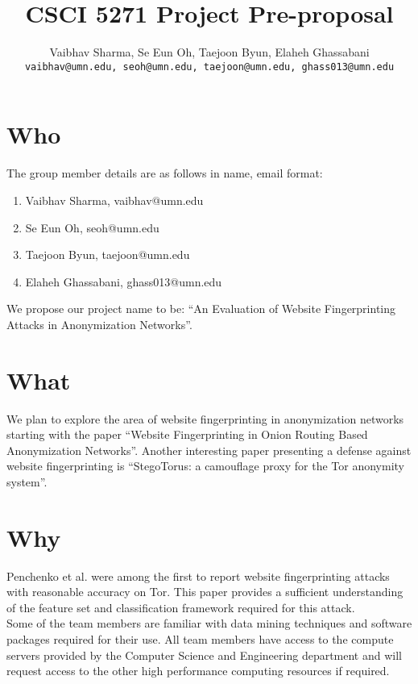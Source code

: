 \documentclass{article}
\title{CSCI 5271 Project Pre-proposal}
\author{Vaibhav Sharma, Se Eun Oh, Taejoon Byun, Elaheh Ghassabani\\
\texttt{vaibhav@umn.edu, seoh@umn.edu, taejoon@umn.edu, ghass013@umn.edu}\\
}
\begin{document}
\maketitle


\section{Who}
The group member details are as follows in name, email format:

\begin{enumerate}

\item Vaibhav Sharma, vaibhav@umn.edu
\item Se Eun Oh, seoh@umn.edu
\item Taejoon Byun, taejoon@umn.edu
\item Elaheh Ghassabani, ghass013@umn.edu

\end{enumerate}

We propose our project name to be: ``An Evaluation of Website
Fingerprinting Attacks in Anonymization Networks''.


\section{What}
We plan to explore the area of website fingerprinting in anonymization
networks starting with the paper ``Website Fingerprinting in Onion Routing
Based Anonymization Networks''\cite{panchenko2011}. Another interesting
paper presenting a defense against website fingerprinting is
``StegoTorus: a camouflage proxy for the Tor anonymity
system''\cite{weinberg2012}. 

\section{Why}
Penchenko et al.\cite{panchenko2011} were among the first to report
website fingerprinting attacks with reasonable accuracy on Tor. This
paper provides a sufficient understanding of the feature set and
classification framework required for this attack. \\
Some of the team members are familiar with data mining techniques and
software packages required for their use. All team members have access
to the compute servers provided by the Computer Science and Engineering
department and will request access to the other high performance
computing resources if required.
\end{document}
